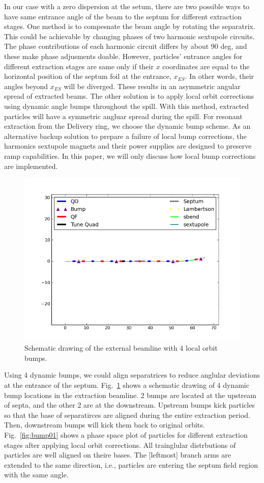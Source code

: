 \documentclass[aps,prstab,onecolumn,preprint,endfloats]{revtex4-1}
\begin{document}
In our case with a zero dispersion at the setum, there are two possible ways to have same entrance angle of the beam to the septum for different extraction stages.
One method is to compesnate the beam angle by rotating the separatrix. This could be achievable by changing phases of two harmonic sextupole circuits.
The phase contributions of each harmonic circuit differs by about 90 deg, and these make phase adjusments doable.
However, particles' entrance angles for different extraction stages are same only if their $x$ coordinates are equal to the horizontal position of the septum foil at the entrance, $x_{ES}$.
In other words, their angles beyond $x_{ES}$ will be diverged.
These results in an asymmetric angular spread of extracted beams.
The other solution is to apply local orbit corrections using dynamic angle bumps throughout the spill.
With this method, extracted particles will have a symmetric angluar spread during the spill.
For resonant extraction from the Delivery ring, we choose the dynamic bump scheme.
As an alternative backup solution to prepare a failure of local bump corrections, the harmonics sextupole magnets and their power supplies are designed to preserve ramp capabilities.
In this paper, we will only discuss how local bump corrections are implemented.

\begin{figure}[!htbp]
  \includegraphics[width=.45\textwidth]{img/20140109-00.png}
  \caption{\label{fig:bump1}Schematic drawing of the external beamline with 4 local orbit bumps.}
\end{figure}

Using 4 dynamic bumps, we could align separatrices to reduce anglular deviations at the entrance of the septum.
Fig.~\ref{fig:bump1} shows a schematic drawing of 4 dynamic bump locations in the extraction beamline.
2 bumps are located at the upstream of septa, and the other 2 are at the downstream.
Upstream bumps kick particles so that the base of separatirces are aligned during the entire extraction period.
Then, downstream bumps will kick them back to original orbits.
Fig.~\ref{fig:bump01} shows a phase space plot of particles for different extraction stages after applying local orbit corrections.
All trainglular distrbutions of particles are well aligned on theire bases.
The [leftmost] branch arms are extended to the same direction, i.e., particles are entering the septum field region with the same angle.
\end{document}
